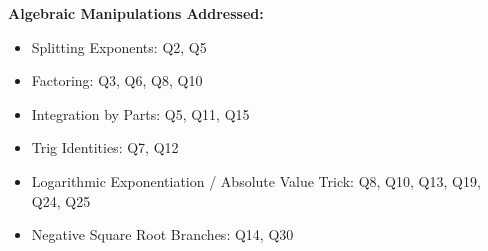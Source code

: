 \documentclass[11pt]{article}
\begin{document}
\textbf{Algebraic Manipulations Addressed:}
\begin{itemize}
    \item Splitting Exponents: Q2, Q5
    \item Factoring: Q3, Q6, Q8, Q10
    \item Integration by Parts: Q5, Q11, Q15
    \item Trig Identities: Q7, Q12
    \item Logarithmic Exponentiation / Absolute Value Trick: Q8, Q10, Q13, Q19, Q24, Q25
    \item Negative Square Root Branches: Q14, Q30
\end{itemize}
\end{document}
